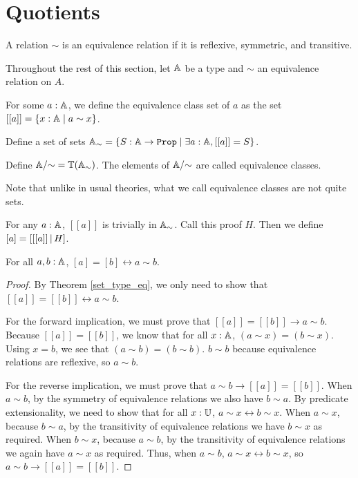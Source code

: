 \documentclass[../../math.tex]{subfiles}
\begin{document}
\section{Quotients}

\begin{definition}
    A relation $\sim$ is an equivalence relation if it is reflexive, symmetric,
    and transitive.
\end{definition}

Throughout the rest of this section, let $\mathbb{A}$ be a type and $\sim$ an
equivalence relation on $A$.

\begin{definition}
    For some $a : \mathbb{A}$, we define the equivalence class set of $a$ as the set
    $[[a]] = \{x : \mathbb{A} \mid a \sim x\}$.
\end{definition}

\begin{definition}
    Define a set of sets $\A_\sim = \{S : \A \to \Prop \mid \exists a : \A,
    [[a]] = S\}$.
\end{definition}

\begin{definition}
    Define $\mathbb{A}/{\sim} = \mathbb{T}(\mathbb{A}_\sim)$.  The elements of $\mathbb{A}/{\sim}$ are called
    equivalence classes.
\end{definition}
Note that unlike in usual theories, what we call equivalence classes are not
quite sets.

\begin{definition}
    For any $a : \mathbb{A}$, $[ [a]]$ is trivially in $\mathbb{A}_\sim$.  Call this proof $H$.
    Then we define $[a] = [ [ [a]] \, | \, H ]$.
\end{definition}

\begin{theorem} \label{equiv_eq}
    For all $a, b : \mathbb{A}$, $[a] = [b] \leftrightarrow a \sim b$.
\end{theorem}
\begin{proof}
    By Theorem \ref{set_type_eq}, we only need to show that $[ [a]] = [ [b]]
    \leftrightarrow a \sim b$.

    For the forward implication, we must prove that $[ [a]] = [ [b]] \to a \sim
    b$.  Because $[ [a]] = [ [b]]$, we know that for all $x : \mathbb{A}$, $(a \sim x) =
    (b \sim x)$.  Using $x = b$, we see that $(a \sim b) = (b \sim b)$.  $b \sim
    b$ because equivalence relations are reflexive, so $a \sim b$.

    For the reverse implication, we must prove that $a \sim b \to [ [a]] = [
    [b]]$.  When $a \sim b$, by the symmetry of equivalence relations we also
    have $b \sim a$.  By predicate extensionality, we need to show that for all
    $x : \mathbb{U}$, $a \sim x \leftrightarrow b \sim x$.  When $a \sim x$, because $b
    \sim a$, by the transitivity of equivalence relations we have $b \sim x$ as
    required.  When $b \sim x$, because $a \sim b$, by the transitivity of
    equivalence relations we again have $a \sim x$ as required.  Thus, when $a
    \sim b$, $a \sim x \leftrightarrow b \sim x$, so $a \sim b \to [ [a]] = [
    [b]]$.
\end{proof}
\end{document}
